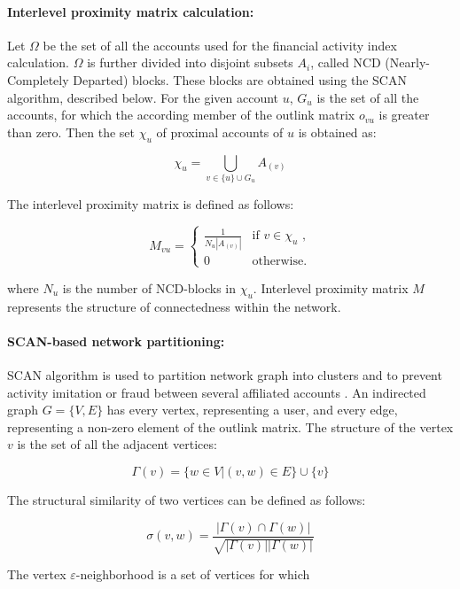 \documentclass[a4paper,12pt]{article}
\begin{document}
\paragraph{Interlevel proximity matrix calculation:}
Let $\Omega$ be the set of all the accounts used for the financial activity index calculation. $\Omega$ is further divided into disjoint subsets $A_i$, called NCD (Nearly-Completely Departed) blocks. These blocks are obtained using the SCAN algorithm, described below. For the given account $u$, $G_u$ is the set of all the accounts, for which the according member of the outlink matrix $o_{vu}$ is greater than zero. Then the set $\chi_u$ of proximal accounts of $u$ is obtained as: 



$$
\chi_u = \bigcup_{v \in \{u\} \cup G_u} A_{(v)}
$$

The interlevel proximity matrix is defined as follows:



$$
M_{vu}=\begin{cases}
 \frac{1}{N_u |A_{(v)}|}
 & \text{if $v \in \chi_u$ ,}\\
 0 & \text{otherwise.}
\end{cases}
$$

where $N_u$ is the number of NCD-blocks in $\chi_u$. Interlevel proximity matrix $M$ represents the structure of connectedness within the network.



\paragraph{SCAN-based network partitioning:}
SCAN algorithm is used to partition network graph into clusters and to prevent activity imitation or fraud between several affiliated accounts \cite{SCAN}. An indirected graph $G = \{V, E\}$ has every vertex, representing a user, and every edge, representing a non-zero element of the outlink matrix. The structure of the vertex $v$ is the set of all the adjacent vertices:


$$
\Gamma(v)=\{w \in V|(v,w) \in E\} \cup \{v\}
$$

The structural similarity of two vertices can be defined as follows:



$$
\sigma(v,w)=\frac{ |\Gamma(v) \cap \Gamma(w)|}{\sqrt{|\Gamma(v)||\Gamma(w)|}}
$$

The vertex $\varepsilon$-neighborhood is a set of vertices for which
\end{document}
